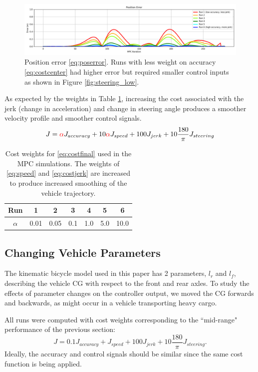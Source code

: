 \documentclass[conference]{IEEEtran}
\begin{document}
\begin{figure}[htbp]
	\includegraphics[width=1.0\linewidth]{errors.png}
	\caption{Position error \eqref{eq:poserror}. Runs with less weight on accuracy \eqref{eq:costcenter} had higher error but required smaller control inputs as shown in Figure \ref{fig:steering_low}.}
	\label{fig:errors}
\end{figure}

As expected by the weights in Table \ref{tab:weights}, increasing the cost associated with the jerk (change in acceleration) and change in steering angle produces a smoother velocity profile and smoother control signals.
$$J = \textcolor{red}{\alpha} J_{accuracy} + 10\textcolor{red}{\alpha} J_{speed} + 100 J_{jerk} + 10\frac{180}{\pi} J_{steering}$$

\begin{table}[htbp]
	\caption{Cost weights for \eqref{eq:costfinal} used in the MPC simulations. The weights of \eqref{eq:speed} and \eqref{eq:costjerk} are increased to produce increased smoothing of the vehicle trajectory.}
	\centering
	\renewcommand{\arraystretch}{1.25}
	\begin{tabular}{c|cccccc}
		Run & 1 & 2 & 3 & 4 & 5 & 6
		\\\hline
		$\alpha$ & 0.01 & 0.05 & 0.1 & 1.0 & 5.0 & 10.0
	\end{tabular}
\label{tab:weights}
\end{table}

\subsection{Changing Vehicle Parameters}
The kinematic bicycle model used in this paper has 2 parameters, $l_r$ and $l_f$, describing the vehicle CG with respect to the front and rear axles. To study the effects of parameter changes on the controller output, we moved the CG forwards and backwards, as might occur in a vehicle transporting heavy cargo.

All runs were computed with cost weights corresponding to the ``mid-range" performance of the previous section:
$$J = 0.1J_{accuracy} + J_{speed} + 100J_{jerk} + 10\frac{180}{\pi} J_{steering}.$$
Ideally, the accuracy and control signals should be similar since the same cost function is being applied.
\end{document}
